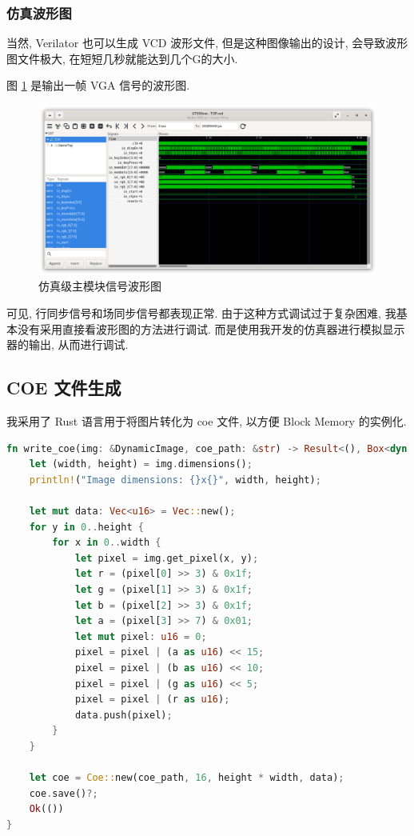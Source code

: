 \subsubsection{仿真波形图}

当然, Verilator 也可以生成 VCD 波形文件, 但是这种图像输出的设计, 会导致波形图文件极大, 在短短几秒就能达到几个G的大小.

图 \ref{fig:wave} 是输出一帧 VGA 信号的波形图. 

\begin{figure}
    \centering
    \includegraphics[width=\textwidth]{res/img/wave.png}
    \caption{仿真级主模块信号波形图}
    \label{fig:wave}
\end{figure}

可见, 行同步信号和场同步信号都表现正常. 由于这种方式调试过于复杂困难, 我基本没有采用直接看波形图的方法进行调试. 
而是使用我开发的仿真器进行模拟显示器的输出, 从而进行调试.

\subsection{COE 文件生成}

我采用了 Rust 语言用于将图片转化为 coe 文件, 以方便 Block Memory 
的实例化. 

\begin{lstlisting}[language=Rust]
fn write_coe(img: &DynamicImage, coe_path: &str) -> Result<(), Box<dyn std::error::Error>> {
    let (width, height) = img.dimensions();
    println!("Image dimensions: {}x{}", width, height);

    let mut data: Vec<u16> = Vec::new();
    for y in 0..height {
        for x in 0..width {
            let pixel = img.get_pixel(x, y);
            let r = (pixel[0] >> 3) & 0x1f;
            let g = (pixel[1] >> 3) & 0x1f;
            let b = (pixel[2] >> 3) & 0x1f;
            let a = (pixel[3] >> 7) & 0x01;
            let mut pixel: u16 = 0;
            pixel = pixel | (a as u16) << 15;
            pixel = pixel | (b as u16) << 10;
            pixel = pixel | (g as u16) << 5;
            pixel = pixel | (r as u16);
            data.push(pixel);
        }
    }

    let coe = Coe::new(coe_path, 16, height * width, data);
    coe.save()?;
    Ok(())
}
\end{lstlisting}

